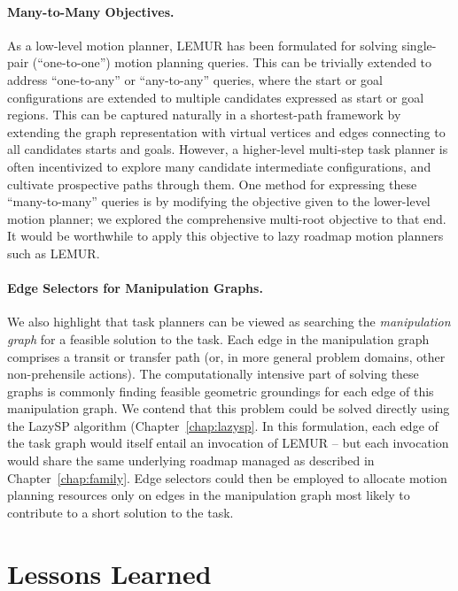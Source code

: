 \paragraph{Many-to-Many Objectives.}
As a low-level motion planner,
LEMUR has been formulated for solving single-pair
(``one-to-one'') motion planning queries.
This can be trivially extended to address ``one-to-any''
or ``any-to-any'' queries, where the start or goal configurations are
extended to multiple candidates expressed as start or goal regions.
This can be captured naturally in a shortest-path framework by extending
the graph representation with virtual vertices and edges connecting
to all candidates starts and goals.
However, a higher-level multi-step task planner is often incentivized
to explore many candidate intermediate configurations,
and cultivate prospective paths through them.
One method for expressing these ``many-to-many'' queries is by
modifying the objective given to the lower-level motion planner;
we explored the comprehensive multi-root objective
\citep{dellin2015cmr} to that end.
It would be worthwhile to apply this objective to lazy roadmap motion
planners such as LEMUR.

\paragraph{Edge Selectors for Manipulation Graphs.}
We also highlight that task planners can be viewed as searching
the \emph{manipulation graph} \citep{simeon2004manipulation}
for a feasible solution to the task.
Each edge in the manipulation graph comprises a transit or transfer
path
(or, in more general problem domains, other non-prehensile actions).
The computationally intensive part of solving these graphs is
commonly finding feasible geometric groundings for each edge of this
manipulation graph.
We contend that this problem could be solved directly using the LazySP
algorithm (Chapter~\ref{chap:lazysp}.
In this formulation,
each edge of the task graph would itself entail an invocation of LEMUR
-- but each invocation would share the same underlying roadmap
managed as described in Chapter~\ref{chap:family}.
Edge selectors could then be employed to allocate motion planning
resources only on edges in the manipulation graph
most likely to contribute to a short solution to the task.


\section{Lessons Learned}
\label{sec:conclusion:lessons-learned}

